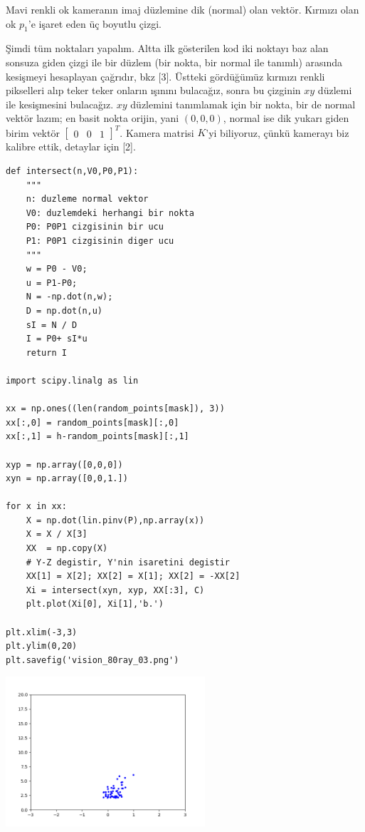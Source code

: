 \documentclass[12pt,fleqn]{article}\usepackage{../../common}
\begin{document}
Mavi renkli ok kameranın imaj düzlemine dik (normal) olan vektör. Kırmızı
olan ok $p_1$'e işaret eden üç boyutlu çizgi. 

Şimdi tüm noktaları yapalım. Altta ilk gösterilen kod iki noktayı baz alan
sonsuza giden çizgi ile bir düzlem (bir nokta, bir normal ile tanımlı)
arasında kesişmeyi hesaplayan çağrıdır, bkz [3]. Üstteki gördüğümüz kırmızı renkli pikselleri alıp teker teker onların
ışınını bulacağız, sonra bu çizginin $xy$ düzlemi ile kesişmesini
bulacağız. $xy$ düzlemini tanımlamak için bir nokta, bir de normal vektör
lazım; en basit nokta orijin, yani $(0,0,0)$, normal ise dik yukarı giden
birim vektör $\left[\begin{array}{ccc} 0&0&1 \end{array}\right]^T$.  Kamera
matrisi $K$'yi biliyoruz, çünkü kamerayı biz kalibre ettik, detaylar için
[2].

\begin{verbatim}
def intersect(n,V0,P0,P1):
    """
    n: duzleme normal vektor
    V0: duzlemdeki herhangi bir nokta
    P0: P0P1 cizgisinin bir ucu
    P1: P0P1 cizgisinin diger ucu
    """
    w = P0 - V0;
    u = P1-P0;
    N = -np.dot(n,w);
    D = np.dot(n,u)
    sI = N / D
    I = P0+ sI*u
    return I

import scipy.linalg as lin

xx = np.ones((len(random_points[mask]), 3))
xx[:,0] = random_points[mask][:,0]
xx[:,1] = h-random_points[mask][:,1]

xyp = np.array([0,0,0])
xyn = np.array([0,0,1.])

for x in xx:
    X = np.dot(lin.pinv(P),np.array(x))
    X = X / X[3]
    XX  = np.copy(X)
    # Y-Z degistir, Y'nin isaretini degistir
    XX[1] = X[2]; XX[2] = X[1]; XX[2] = -XX[2]
    Xi = intersect(xyn, xyp, XX[:3], C)
    plt.plot(Xi[0], Xi[1],'b.')

plt.xlim(-3,3)
plt.ylim(0,20)
plt.savefig('vision_80ray_03.png')
\end{verbatim}

\includegraphics[width=20em]{vision_80ray_03.png}
\end{document}
